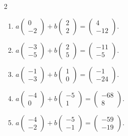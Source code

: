 \begin{multicols}{2}
\begin{enumerate}[label=\arabic*.,  leftmargin=*]
\item $a\begin{pmatrix} 0 \\ -2 \end{pmatrix} + b\begin{pmatrix} 2 \\ 2 \end{pmatrix} = \begin{pmatrix} 4 \\ -12 \end{pmatrix}$.
\item $a\begin{pmatrix} -3 \\ -5 \end{pmatrix} + b\begin{pmatrix} 2 \\ 5 \end{pmatrix} = \begin{pmatrix} -11 \\ -5 \end{pmatrix}$.
\item $a\begin{pmatrix} -1 \\ -3 \end{pmatrix} + b\begin{pmatrix} 1 \\ 0 \end{pmatrix} = \begin{pmatrix} -1 \\ -24 \end{pmatrix}$.
\item $a\begin{pmatrix} -4 \\ 0 \end{pmatrix} + b\begin{pmatrix} -5 \\ 1 \end{pmatrix} = \begin{pmatrix} -68 \\ 8 \end{pmatrix}$.
\item $a\begin{pmatrix} -4 \\ -2 \end{pmatrix} + b\begin{pmatrix} -5 \\ -1 \end{pmatrix} = \begin{pmatrix} -59 \\ -19 \end{pmatrix}$.

\end{enumerate}
\end{multicols}
